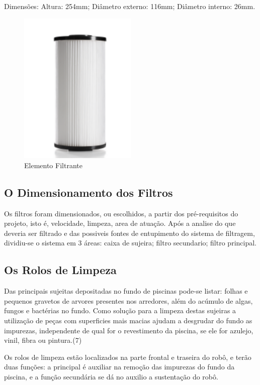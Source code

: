 \begin{description}
Dimensões: Altura: 254mm; Diâmetro externo: 116mm; Diâmetro interno: 26mm.
\par
  \begin{figure}[h]
    \centering
    \includegraphics[width=0.5\textwidth]{figures/filter.png}
    \caption{Elemento Filtrante}
    \label{fig:filter}
  \end{figure}
  \FloatBarrier
\par
\end{description}
\subsection{O Dimensionamento dos Filtros}
Os filtros foram dimensionados, ou escolhidos, a partir dos pré-requisitos do projeto, isto é, velocidade, limpeza, area de atuação. Após a analise do que deveria ser filtrado e das possiveis fontes de entupimento do sistema de filtragem, dividiu-se o sistema em 3 áreas: caixa de sujeira; filtro secundario; filtro principal.

\subsection{Os Rolos de Limpeza}
Das principais sujeitas depositadas no fundo de piscinas pode-se listar: folhas e pequenos gravetos de arvores presentes nos arredores, além do acúmulo de algas, fungos e bactérias no fundo. Como solução para a limpeza destas sujeiras a utilização de peças com superficies mais macias ajudam a desgrudar do fundo as impurezas, independente de qual for o revestimento da piscina, se ele for azulejo, vinil, fibra ou pintura.(7)

Os rolos de limpeza estão localizados na parte frontal e traseira do robô, e  terão duas funções: a principal é auxiliar na remoção das impurezas do fundo da piscina, e a função secundária se dá no auxilio a sustentação do robô. 

